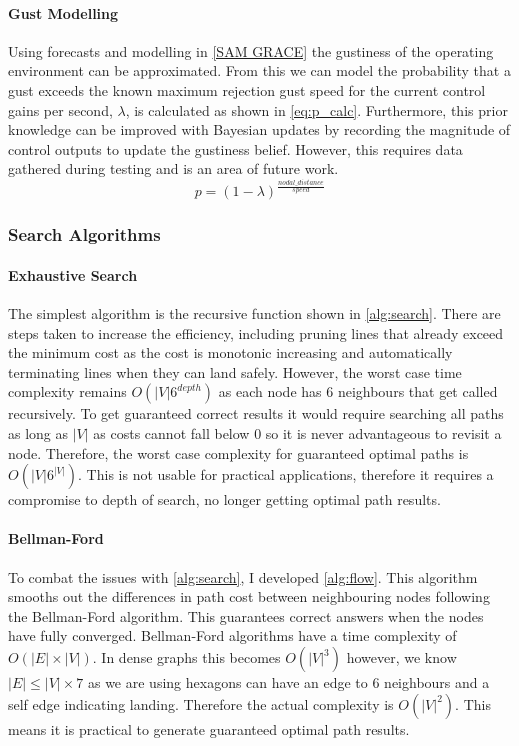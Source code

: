\paragraph{Gust Modelling}
Using forecasts and modelling in \ref{SAM GRACE} the gustiness of the operating environment can be approximated. From this we can model the probability that a gust exceeds the known maximum rejection gust speed for the current control gains per second, $\lambda$, is calculated as shown in \ref{eq:p_calc}. Furthermore, this prior knowledge can be improved with Bayesian updates by recording the magnitude of control outputs to update the gustiness belief. However, this requires data gathered during testing and is an area of future work.
\begin{equation}\label{eq:p_calc}
    p = (1-\lambda)^{\frac{nodal\_distance}{speed}}
\end{equation}

\subsubsection{Search Algorithms}\label{sub_sub_section:tgt_search}


\paragraph{Exhaustive Search}
The simplest algorithm is the recursive function shown in \ref{alg:search}. There are steps taken to increase the efficiency, including pruning lines that already exceed the minimum cost as the cost is monotonic increasing and automatically terminating lines when they can land safely. However, the worst case time complexity remains $O(|V|6^{depth})$ as each node has 6 neighbours that get called recursively. To get guaranteed correct results it would require searching all paths as long as $|V|$ as costs cannot fall below 0 so it is never advantageous to revisit a node. Therefore, the worst case complexity for guaranteed optimal paths is $O(|V|6^{|V|})$. This is not usable for practical applications, therefore it requires a compromise to depth of search, no longer getting optimal path results.
\paragraph{Bellman-Ford}
To combat the issues with \ref{alg:search}, I developed \ref{alg:flow}. This algorithm smooths out the differences in path cost between neighbouring nodes following the Bellman-Ford algorithm. This guarantees correct answers when the nodes have fully converged. Bellman-Ford algorithms have a time complexity of $O(|E|\times |V|)$. In dense graphs this becomes  $O(|V|^3)$ however, we know $|E| \leq |V| \times 7$ as we are using hexagons can have an edge to 6 neighbours and a self edge indicating landing. Therefore the actual complexity is $O(|V|^2)$\cite{cormen2009}. This means it is practical to generate guaranteed optimal path results.

